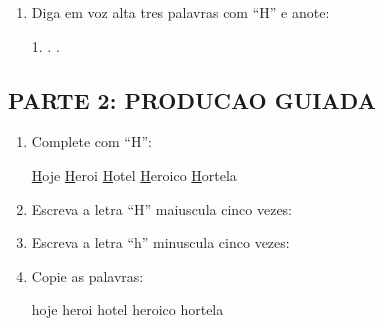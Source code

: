 \begin{exercicio}
\begin{enumerate}
  \item Diga em voz alta tres palavras com ``H'' e anote:
  \begin{center}
  1. \underline{\hspace{4cm}} . \underline{\hspace{4cm}} . \underline{\hspace{4cm}}
  \end{center}
\end{enumerate}

\subsection*{PARTE 2: PRODUCAO GUIADA}

\begin{enumerate}[resume]
  \item Complete com ``H'':
  \begin{center}
  \underline{H}oje \quad \underline{H}eroi \quad \underline{H}otel \quad \underline{H}eroico \quad \underline{H}ortela
  \end{center}

  \item Escreva a letra ``H'' maiuscula cinco vezes:
  \begin{center}
  \underline{\hspace{1.5cm}} \quad \underline{\hspace{1.5cm}} \quad \underline{\hspace{1.5cm}} \quad \underline{\hspace{1.5cm}} \quad \underline{\hspace{1.5cm}}
  \end{center}

  \item Escreva a letra ``h'' minuscula cinco vezes:
  \begin{center}
  \underline{\hspace{1.5cm}} \quad \underline{\hspace{1.5cm}} \quad \underline{\hspace{1.5cm}} \quad \underline{\hspace{1.5cm}} \quad \underline{\hspace{1.5cm}}
  \end{center}

  \item Copie as palavras:
  \begin{center}
  hoje \quad heroi \quad hotel \quad heroico \quad hortela
  \end{center}


\end{enumerate}
\end{exercicio}
